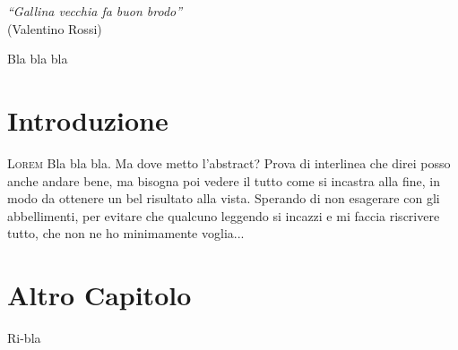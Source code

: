\documentclass[a4paper,12pt,openright,twoside,titlepage]{book}
\newcommand{\fncyblank}{\fancyhf{}}
\newenvironment{abstract}%
{\cleardoublepage\fncyblank\null\vfill\begin{center}%
	\bfseries\abstractname\end{center}}%
{\vfill\null}
\begin{document}
\thispagestyle{empty}

\begin{titlepage}
	\thispagestyle{empty}
	\begin{flushright}
		\vspace*{40 mm}
		\small{\emph{``Gallina vecchia fa buon brodo''}\\(Valentino Rossi)}
	\end{flushright}	
	\vfill
\end{titlepage}
\thispagestyle{empty}

\begin{titlepage}
	\begin{abstract}
		Bla bla bla
		\vfill
	\end{abstract}
\end{titlepage}
\thispagestyle{empty}

\frontmatter
\tableofcontents
\mainmatter



\chapter{Introduzione}
\lettrine[lines=2]{L}{orem} Bla bla bla. Ma dove metto l'abstract? Prova di interlinea che direi posso anche andare bene, ma bisogna poi vedere il tutto come si incastra alla fine, in modo da ottenere un bel risultato alla vista. Sperando di non esagerare con gli abbellimenti, per evitare che qualcuno leggendo si incazzi e mi faccia riscrivere tutto, che non ne ho minimamente voglia...

\chapter{Altro Capitolo}
Ri-bla


\begin{thebibliography}{99}
	
\end{thebibliography}

\end{document}
